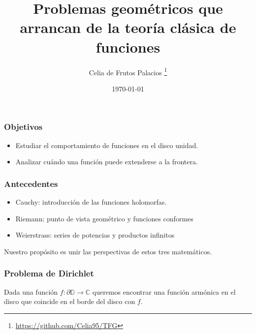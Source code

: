 \documentclass[spanish, a4paper, 12pt, final, slideColor, nototal, colorBG, pdf, noaccumulate, darkblue]{beamer}
\title{Problemas geométricos que arrancan de la teoría clásica de funciones}
\author{Celia de Frutos Palacios \thanks{\url{https://github.com/Celia95/TFG}}}
\subtitle{}
\institute[UCM]{}
\date{\today}
\newcommand{\complex}{\mathbb{C}}
\newcommand{\disk}{\mathbb{D}}
\begin{document}
\maketitle

\begin{frame}
    \frametitle{Objetivos}
    \begin{itemize}
        \item Estudiar el comportamiento de funciones en el disco unidad.
        \item Analizar cuándo una función puede extenderse a la frontera.
    \end{itemize}
\end{frame}

\begin{frame}
    \frametitle{Antecedentes}
    \begin{itemize}
        \item Cauchy: introducción de las funciones holomorfas.
        \item Riemann: punto de vista geométrico y funciones conformes
        \item Weierstrass: series de potencias y productos infinitos
    \end{itemize}
    Nuestro propósito es unir las perspectivas de estos tres matemáticos.
\end{frame}


\begin{frame}
    \frametitle{Problema de Dirichlet}
    \begin{block}{}
        Dada una función $f: \partial \disk \to \complex$ queremos encontrar una función armónica en el disco que coincide en el borde del disco con $f$.
    \end{block}
\end{frame}
\end{document}
